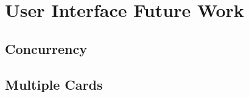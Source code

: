\section{User Interface Future Work}\label{user-interface-future-work}

\subsection{Concurrency}\label{concurrency}

\subsection{Multiple Cards}\label{multiple-cards}
